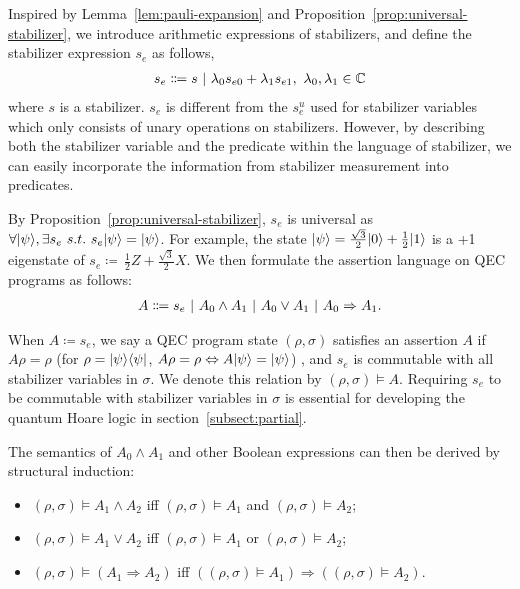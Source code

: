 Inspired by Lemma~\ref{lem:pauli-expansion} and Proposition~\ref{prop:universal-stabilizer}, we introduce arithmetic expressions of stabilizers, and define the stabilizer expression $s_e$ as follows, 
\begin{align}
    s_e \Coloneqq s \vsep \lambda_0 s_{e0} + \lambda_1 s_{e1}, \ \lambda_0, \lambda_1 \in \mathbb{C}
\end{align}
where $s$ is a stabilizer. $s_e$ is different from the $s_e^u$ used for stabilizer variables which only consists of unary operations on stabilizers. However, by describing both the stabilizer variable and the predicate within the language of stabilizer, we can easily incorporate the information from stabilizer measurement into predicates.

By Proposition~\ref{prop:universal-stabilizer},
$s_e$ is universal as $\forall\vert \psi \rangle, \exists s_e\ s.t.\ s_e\vert \psi \rangle = \vert \psi \rangle$. For example, the state $\vert \psi \rangle = \frac{\sqrt{3}}{2}\vert 0 \rangle + \frac{1}{2}\vert 1 \rangle$ is a +1 eigenstate of  $s_e \coloneqq\,\frac{1}{2}Z + \frac{\sqrt{3}}{2}X$. %
We then formulate the assertion language \textbf{{\assnname}} on QEC programs as follows:
\begin{align}
    A \Coloneqq s_e \ \vert\  A_0 \wedge A_1 \ \vert\  A_0 \vee A_1 \ \vert\  A_0 \Rightarrow A_1.
\end{align}

When $A \coloneqq s_e$, we say a QEC program state $(\rho, \sigma)$ satisfies an assertion $A$ if $A\rho = \rho$ (for $\rho=\vert \psi \rangle\langle \psi \vert$, $A\rho = \rho \Leftrightarrow A\vert \psi \rangle = \vert \psi \rangle$) , and $s_e$ is commutable with all stabilizer variables in $\sigma$. We denote this relation by $(\rho,\sigma) \models A$. Requiring $s_e$ to be commutable with stabilizer variables in $\sigma$ is essential for developing the quantum Hoare logic in section~\ref{subsect:partial}.

The semantics of $A_0 \wedge A_1$ and other Boolean expressions can then be derived by structural induction:
\begin{itemize}
    \item $(\rho,\sigma) \models A_1 \wedge A_2$ iff $(\rho,\sigma) \models A_1$ and $(\rho,\sigma) \models A_2$;
    \item $(\rho,\sigma) \models A_1 \vee A_2$ iff $(\rho,\sigma) \models A_1$ or $(\rho,\sigma) \models A_2$;
    \item $(\rho,\sigma) \models (A_1 \Rightarrow A_2)$ iff $((\rho,\sigma) \models A_1) \Rightarrow ((\rho,\sigma) \models A_2)$.
\end{itemize}

